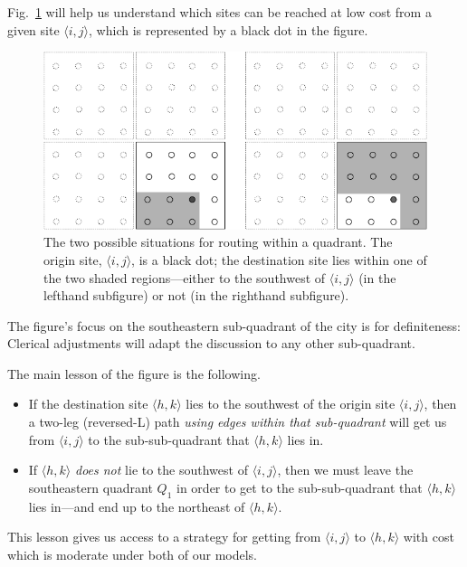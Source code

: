 \begin{itemize}
Fig.~\ref{fig:routingWorstCase} will help us understand which sites can be reached at low cost from a given site $\langle i,j \rangle$, which is represented by a black dot in the figure.
\begin{figure}[hbt]
\begin{center}
       \includegraphics[scale=0.35]{FiguresGraph/routingWorstCase}
       \caption{The two possible situations for routing within a quadrant. The origin site, $\langle i,j \rangle$, is a black dot; the destination site lies within one of the two shaded regions---either to the southwest of $\langle i,j \rangle$ (in the lefthand subfigure) or not (in the righthand subfigure).}
  \label{fig:routingWorstCase}
\end{center}
\end{figure}
The figure's focus on the southeastern sub-quadrant of the city is for definiteness:  Clerical adjustments will adapt the discussion to any other sub-quadrant.

\smallskip

The main lesson of the figure is the following.
\begin{itemize}
\item
If the destination site $\langle h,k \rangle$ lies to the southwest of the origin site $\langle i,j \rangle$, then a two-leg (reversed-L) path {\em using edges within that sub-quadrant} will get us from $\langle i,j \rangle$ to the sub-sub-quadrant that $\langle h,k \rangle$ lies in.
\item
If $\langle h,k \rangle$ {\em does not} lie to the southwest of $\langle i,j \rangle$, then we must leave the southeastern quadrant $Q_1$ in order to get to the sub-sub-quadrant that $\langle h,k \rangle$ lies in---and end up to the northeast of $\langle h,k \rangle$.
\end{itemize}

This lesson gives us access to a strategy for getting from $\langle i,j \rangle$ to $\langle h,k \rangle$ with cost which is moderate under both of our models.


\end{itemize}
